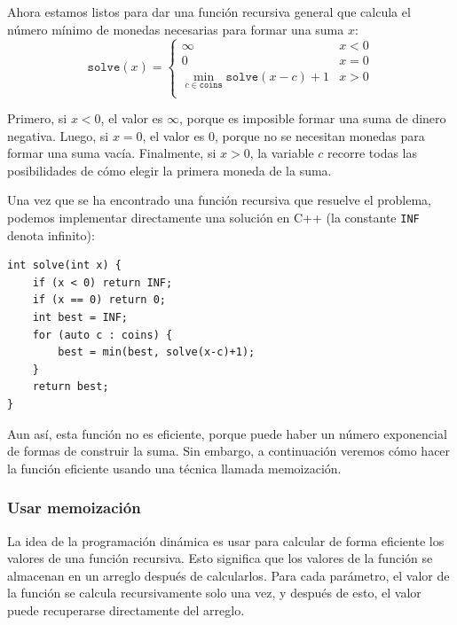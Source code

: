 Ahora estamos listos para dar una función recursiva general
que calcula el número mínimo de
monedas necesarias para formar una suma $x$:
\begin{equation*}
    \texttt{solve}(x) = \begin{cases}
               \infty               & x < 0\\
               0               & x = 0\\
               \min_{c \in \texttt{coins}} \texttt{solve}(x-c)+1 & x > 0 \\
           \end{cases}
\end{equation*}

Primero, si $x<0$, el valor es $\infty$,
porque es imposible formar una suma
de dinero negativa.
Luego, si $x=0$, el valor es $0$,
porque no se necesitan monedas para formar una suma vacía.
Finalmente, si $x>0$, la variable $c$ recorre
todas las posibilidades de cómo elegir la primera moneda
de la suma.

Una vez que se ha encontrado una función recursiva que resuelve el problema,
podemos implementar directamente una solución en C++
(la constante \texttt{INF} denota infinito):

\begin{lstlisting}
int solve(int x) {
    if (x < 0) return INF;
    if (x == 0) return 0;
    int best = INF;
    for (auto c : coins) {
        best = min(best, solve(x-c)+1);
    }
    return best;
}
\end{lstlisting}

Aun así, esta función no es eficiente,
porque puede haber un número exponencial de formas
de construir la suma.
Sin embargo, a continuación veremos cómo hacer la
función eficiente usando una técnica llamada memoización.

\subsubsection{Usar memoización}


La idea de la programación dinámica es usar
 para calcular de forma eficiente
los valores de una función recursiva.
Esto significa que los valores de la función
se almacenan en un arreglo después de calcularlos.
Para cada parámetro, el valor de la función
se calcula recursivamente solo una vez, y después de esto,
el valor puede recuperarse directamente del arreglo.

